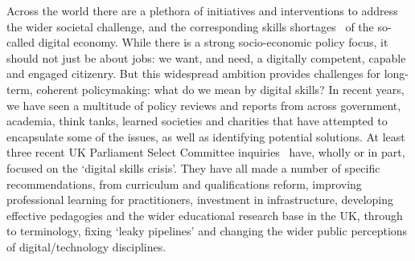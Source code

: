 \documentclass[conference]{IEEEtran}
\begin{document}



Across the world there are a plethora of initiatives and interventions
to address the wider societal challenge, and the corresponding skills
shortages~\cite{cece:2017} of the so-called digital economy. While there is a
strong socio-economic policy focus, it should not just be about jobs:
we want, and need, a digitally competent, capable and engaged
citizenry. But this widespread ambition provides challenges for
long-term, coherent policymaking: what do we mean by digital skills?
In recent years, we have seen a multitude of policy reviews and
reports from across government, academia, think tanks, learned
societies and charities that have attempted to encapsulate some of the
issues, as well as identifying potential solutions. At least three
recent UK Parliament Select Committee
inquiries~\cite{ukholds:2015,ukhocst:2016,ukholc:2017} have, wholly or
in part, focused on the `digital skills crisis'. They have all made a
number of specific recommendations, from curriculum and qualifications
reform, improving professional learning for practitioners, investment
in infrastructure, developing effective pedagogies and the wider
educational research base in the UK, through to terminology, fixing
`leaky pipelines' and changing the wider public perceptions of
digital/technology disciplines.
\end{document}
